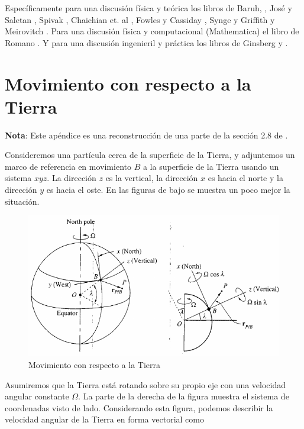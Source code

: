 \documentclass[a4paper,10pt]{article}
\numberwithin{equation}{section}
\begin{document}
Específicamente para una discusión física y teórica los libros de 
Baruh, \cite{baruh}, José y Saletan \cite{saletan}, Spivak \cite{spivak},
Chaichian et. al \cite{chaichian}, Fowles y Cassiday \cite{fowles}, Synge y Griffith \cite{synge} y Meirovitch \cite{meirovitch}. 
Para una discusión física y computacional (Mathematica) el libro de Romano \cite{romano}. Y para una discusión ingenieril y práctica los 
libros de Ginsberg \cite{ginsberg1} y \cite{ginsberg2}.

\newpage

\appendix
\appendixpage

\section{Movimiento con respecto a la Tierra} \label{app:apendice1}

\textbf{Nota}: Este apéndice es una reconstrucción de una parte de la sección 2.8 
de \cite{baruh}. 

\vspace{.3cm}

Consideremos una partícula cerca de la superficie de la Tierra, y adjuntemos un marco 
de referencia en movimiento $B$ a la superficie de la Tierra usando un sistema 
$xyz$. La dirección $z$ es la vertical, la dirección $x$ es hacia el norte y la 
dirección $y$ es hacia el oste. En las figuras de bajo se muestra un poco mejor 
la situación.

\begin{figure}[H]
 \center
 \includegraphics[scale=0.4]{apendice1fig1}
 \caption{Movimiento con respecto a la Tierra}
  \label{fig:apendice1fig1}
\end{figure}

Asumiremos que la Tierra está rotando sobre su propio eje con una velocidad angular 
constante $\Omega$. La parte de la derecha de la figura  
muestra el sistema de coordenadas visto de lado. Considerando esta figura, podemos 
describir la velocidad angular de la Tierra en forma vectorial como
\end{document}
